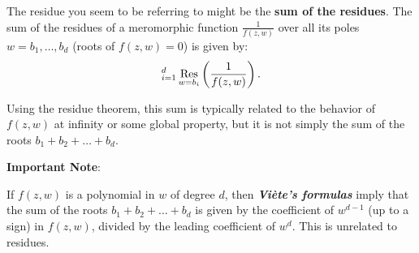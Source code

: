\documentclass[lang=en,12pt,twoside]{textbook}
\let\sum\relax
\DeclareMathOperator*{\res}{Res} %
\begin{document}
The residue you seem to be referring to might be the  \textbf{sum of the residues}. The sum of the residues of a meromorphic function $ \frac{1}{f(z,w)} $ over all its poles $ w = b_1, \dots, b_d $ (roots of $ f(z, w) = 0 $) is given by:
$$
\sum_{i=1}^d \res_{w=b_i} \left( \frac{1}{f(z,w)} \right).
$$

Using the residue theorem, this sum is typically related to the behavior of $ f(z,w) $ at infinity or some global property, but it is not simply the sum of the roots $ b_1 + b_2 + \dots + b_d $.

 \textbf{Important Note}:

If $ f(z,w) $ is a polynomial in $ w $ of degree $ d $, then  \textbf{\textit{Viète's formulas}} imply that the sum of the roots $ b_1 + b_2 + \dots + b_d $ is given by the coefficient of $ w^{d-1} $ (up to a sign) in $ f(z,w) $, divided by the leading coefficient of $ w^d $. This is unrelated to residues.
















%
\printbibliography[heading=bibintoc]
\end{document}
